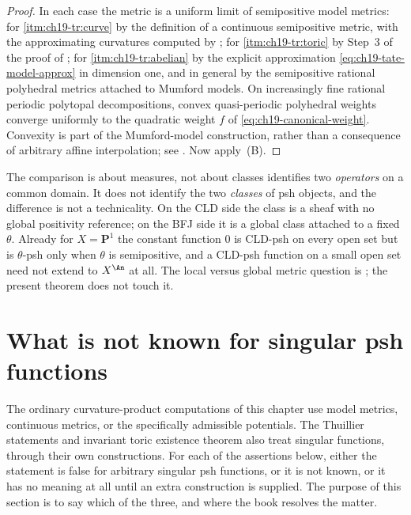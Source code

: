 \begin{proof}
In each case the metric is a uniform limit of semipositive model metrics:
for \cref{itm:ch19-tr:curve} by the definition of a continuous
semipositive metric, with the approximating curvatures computed by
; for \cref{itm:ch19-tr:toric} by
Step~3 of the proof of ; for
\cref{itm:ch19-tr:abelian} by the explicit approximation
\eqref{eq:ch19-tate-model-approx} in dimension one, and in general by the
semipositive rational polyhedral metrics attached to Mumford models.  On
increasingly fine rational periodic polytopal decompositions, convex
quasi-periodic polyhedral weights converge uniformly to the quadratic weight
$f$ of \eqref{eq:ch19-canonical-weight}.  Convexity is part of the
Mumford-model construction, rather than a consequence of arbitrary affine
interpolation; see \cite{Gub10CM}.  Now apply
\,(B).
\end{proof}

\begin{warning}{The comparison is about measures, not about classes}
 identifies two \emph{operators} on a
common domain.  It does not identify the two \emph{classes} of psh objects,
and the difference is not a technicality.  On the CLD side the class is a
sheaf with no global positivity reference; on the BFJ side it is a global
class attached to a fixed $\theta$.  Already for $X=\mathbf P^1$ the
constant function $0$ is CLD-psh on every open set but is
$\theta$-psh only when $\theta$ is semipositive, and a CLD-psh function
on a small open set need not extend to $X^{\An}$ at all.  The local versus
global metric question is ; the
present theorem does not touch it.
\end{warning}

\section{What is not known for singular psh functions}
\label{sec:ch19-limitations}

The ordinary curvature-product computations of this chapter use model
metrics, continuous metrics, or the specifically admissible potentials.
The Thuillier statements and invariant toric existence theorem also treat
singular functions, through their own constructions.  For each of the
assertions below, either the statement is false for arbitrary singular psh
functions, or it is not known, or it has no meaning at all until an extra
construction is supplied.  The purpose of this section is to say which of
the three, and where the book resolves the matter.

